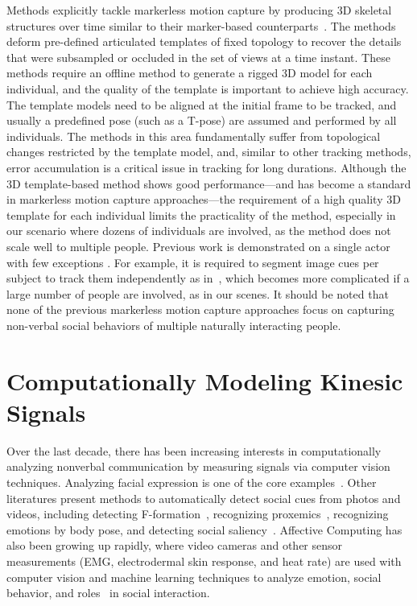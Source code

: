 Methods explicitly tackle markerless motion capture by producing 3D skeletal structures over time similar to their marker-based counterparts~\cite{Gall-09, Gavrila-96, Cheung-05,Plankers-03, Bregler-04, Kehl-06, Corazza-10, Vlasic-08, Brox-10, Stoll-11, deAguiar-2008, Vlasic-2008, Furukawa-2008}. The methods deform pre-defined articulated templates of fixed topology to recover the details that were subsampled or occluded in the set of views at a time instant. These methods require an offline method to generate a rigged 3D model for each individual, and the quality of the template is important to achieve high accuracy. The template models need to be aligned at the initial frame to be tracked, and usually a predefined pose (such as a T-pose) are assumed and performed by all individuals. The methods in this area fundamentally suffer from topological changes restricted by the template model, and, similar to other tracking methods, error accumulation is a critical issue in tracking for long durations. Although the 3D template-based method shows good performance---and has become a standard in markerless motion capture approaches---the requirement of a high quality 3D template for each individual limits the practicality of the method, especially in our scenario where dozens of individuals are involved, as the method does not scale well to multiple people. Previous work is demonstrated on a single actor with few exceptions \cite{Ye-2012, Liu-2013}. For example, it is required to segment image cues per subject to track them independently as in~\cite{Liu-2013}, which becomes more complicated if a large number of people are involved, as in our scenes. It should be noted that none of the previous markerless motion capture approaches focus on capturing non-verbal social behaviors of multiple naturally interacting people.


\section{Computationally Modeling Kinesic Signals}
Over the last decade, there has been increasing interests in computationally analyzing nonverbal communication by measuring signals via computer vision techniques.  Analyzing facial expression is one of the core examples~\cite{ChuDC13, Torre15, shan2009facial}. Other literatures present methods to automatically detect social cues from photos and videos, including detecting F-formation~\cite{setti2015f}, recognizing proxemics~\cite{yang2012recognizing}, recognizing emotions by body pose\cite{schindler2008recognizing}, and detecting social saliency~\cite{park20123d}. Affective Computing has also been growing up rapidly, where video cameras and other sensor measurements (EMG, electrodermal skin response, and heat rate) are used with computer vision and machine learning techniques to analyze emotion, social behavior, and roles~\cite{picard1997affective} in social interaction. 

